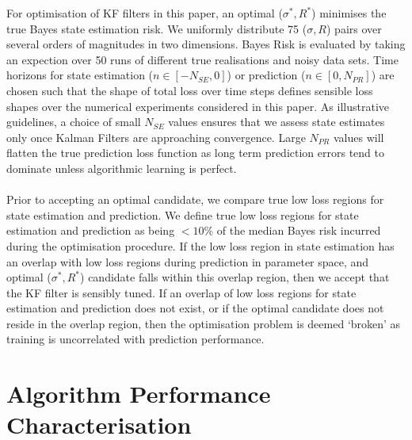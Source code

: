 For optimisation of KF filters in this paper, an optimal ($\sigma^*, R^*$) minimises the true Bayes state estimation risk. We uniformly distribute 75 ($\sigma, R$) pairs over several orders of magnitudes in two dimensions. Bayes Risk is evaluated by taking an expection over 50 runs of different true realisations and noisy data sets. Time horizons for state estimation ($n \in  [-N_{SE}, 0]$) or prediction ($n \in  [0, N_{PR}]$) are chosen such that the shape of total loss over time steps defines sensible loss shapes over the numerical experiments considered in this paper. As illustrative guidelines, a choice of small $N_{SE}$ values ensures that we assess state estimates only once Kalman Filters are approaching convergence. Large $N_{PR}$ values will flatten the true prediction loss function as long term prediction errors tend to dominate unless algorithmic learning is perfect. 
\\
\\
Prior to accepting an optimal candidate, we compare true low loss regions for state estimation and prediction. We define true low loss regions for state estimation and prediction as being $<10 \%$ of the median Bayes risk incurred during the optimisation procedure. If the low loss region in state estimation has an overlap with low loss regions during prediction in parameter space, and optimal ($\sigma^*, R^*$) candidate falls within this overlap region, then we accept that the KF filter is sensibly tuned. If an overlap of low loss regions for state estimation and prediction does not exist, or if the optimal candidate does not reside in the overlap region, then the optimisation problem is deemed `broken' as training is uncorrelated with prediction performance. 
 
\section{Algorithm Performance Characterisation \label{sec:main:Performance}}


